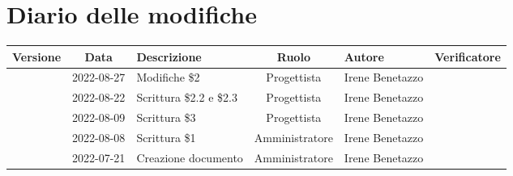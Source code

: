 \section*{Diario delle modifiche}
	\begin{center}
	\renewcommand{\arraystretch}{1.8} %
	\begin{longtable}{ |c|c|p{8em}|c|m{5em}|m{6em}| }
	\hline
	\textbf{Versione} & \textbf{Data} & \textbf{Descrizione} &  \textbf{Ruolo} &  \textbf{Autore} & \textbf{Verificatore}\\ %
	\hline %
	& 2022-08-27 & Modifiche \$2 & Progettista & Irene \newline Benetazzo & \\ 
	\hline
	& 2022-08-22 & Scrittura \$2.2 e \$2.3 & Progettista & Irene \newline Benetazzo & \\ 
	\hline
    & 2022-08-09 & Scrittura \$3 & Progettista & Irene \newline Benetazzo & \\ 
	\hline
	& 2022-08-08 & Scrittura \$1 & Amministratore & Irene \newline Benetazzo & \\ 
	\hline
	& 2022-07-21 & Creazione documento & Amministratore & Irene \newline Benetazzo & \\ 
	\hline
	\end{longtable}
	\end{center}
	\newpage